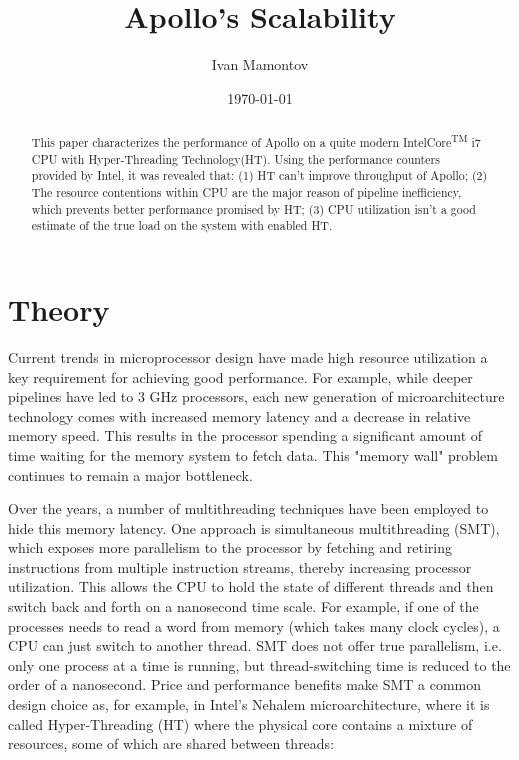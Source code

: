 \documentclass[12pt]{article}
\title{Apollo's Scalability}
\date{\today}
\author{Ivan Mamontov}
\begin{document}
\maketitle

\tableofcontents{}

\clearpage

\begin{versionhistory}
\end{versionhistory}

\clearpage

\begin{abstract}

This paper characterizes the performance of Apollo on a quite modern Intel\circledR Core\textsuperscript{TM} i7 CPU with Hyper-Threading Technology(HT). Using the performance counters provided by Intel, it was revealed that: (1) HT can't improve throughput of Apollo; (2) The resource contentions within CPU are the major reason of pipeline inefficiency, which prevents better performance promised by HT; (3) CPU utilization isn't a good estimate of the true load on the system with enabled HT.

\end{abstract}

\section{Theory}

Current trends in microprocessor design have made high resource utilization a key requirement for achieving good performance. For example, while deeper pipelines have led to 3 GHz processors, each new generation of microarchitecture technology comes with increased memory latency and a decrease in relative memory speed. This results in the processor spending a significant amount of time waiting for the memory system to fetch data. This "memory wall" problem continues to remain a major bottleneck\cite{impact}.

Over the years, a number of multithreading techniques have been employed to hide this memory latency. One approach is simultaneous multithreading (SMT), which exposes more parallelism to the processor by fetching and retiring instructions from multiple instruction streams, thereby increasing processor utilization. This allows the CPU to hold the state of different threads and then switch back and forth on a nanosecond time scale. For example, if one of the processes needs to read a word from memory (which takes many clock cycles), a CPU can just switch to another thread. SMT does not offer true parallelism, i.e. only one process at a time is running, but thread-switching time is reduced to the order of a nanosecond\cite{tanenbaum}. Price and performance benefits make SMT a common design choice as, for example, in Intel's Nehalem microarchitecture, where it is called Hyper-Threading (HT) where the physical core contains a mixture of resources, some of which are shared between threads\cite{intel}:
\end{document}
